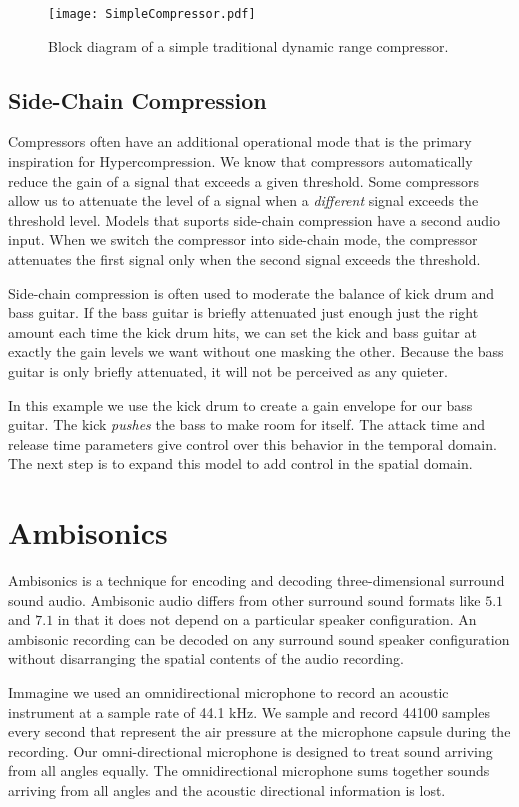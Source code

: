 \begin{figure*}
  \texttt{[image: SimpleCompressor.pdf]}
  \caption{Block diagram of a simple traditional dynamic range
    compressor.}
  \label{fig:comp-block}
\end{figure*}

\subsection{Side-Chain Compression}
\label{sec:side-chain-compr}
Compressors often have an additional operational mode that is the
primary inspiration for Hypercompression. We know that compressors
automatically reduce the gain of a signal that exceeds a given
threshold. Some compressors allow us to attenuate the level of a
signal when a \emph{different} signal exceeds the threshold
level. Models that suports side-chain compression have a second audio
input. When we switch the compressor into side-chain mode, the
compressor attenuates the first signal only when the second signal
exceeds the threshold.

Side-chain compression is often used to moderate the balance of kick
drum and bass guitar. If the bass guitar is briefly attenuated just
enough just the right amount each time the kick drum hits, we can set
the kick and bass guitar at exactly the gain levels we want without
one masking the other. Because the bass guitar is only briefly
attenuated, it will not be perceived as any quieter.

In this example we use the kick drum to create a gain envelope for our
bass guitar. The kick \emph{pushes} the bass to make room for
itself. The attack time and release time parameters give control over
this behavior in the temporal domain. The next step is to
expand this model to add control in the spatial domain.

\section{Ambisonics}
\label{sec:ambisonics}
Ambisonics is a technique for encoding and decoding three-dimensional
surround sound audio.\cite[-15mm]{Gerzon1973,Gerzon1985} Ambisonic
audio differs from other surround sound formats like $5.1$ and $7.1$
in that it does not depend on a particular speaker configuration. An
ambisonic recording can be decoded on any surround sound speaker
configuration without disarranging the spatial contents of the audio
recording.

Immagine we used an omnidirectional microphone to record an acoustic
instrument at a sample rate of 44.1 kHz. We sample and record 44100
samples every second that represent the air pressure at the microphone
capsule during the recording. Our omni-directional microphone is
designed to treat sound arriving from all angles equally. The
omnidirectional microphone sums together sounds arriving from all
angles and the acoustic directional information is lost.

